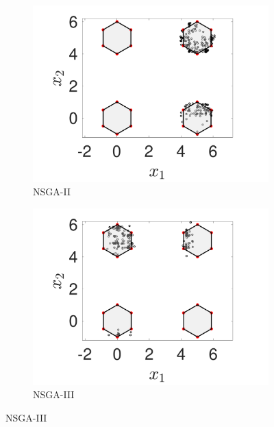 \documentclass[conference]{IEEEtran}
\begin{document}
\begin{figure}[htbp]
    \centering
    \begin{subfigure}[b]{.24\textwidth}
    \includegraphics[width=\linewidth]{Section5/dim4/PS/NSGAII}
    \caption{NSGA-II}
    \end{subfigure}
    \begin{subfigure}[b]{.24\textwidth}
    \includegraphics[width=\linewidth]{Section5/dim4/PS/NSGAIII}
    \caption{NSGA-III}
    \end{subfigure}
    

\end{figure}
\end{document}
